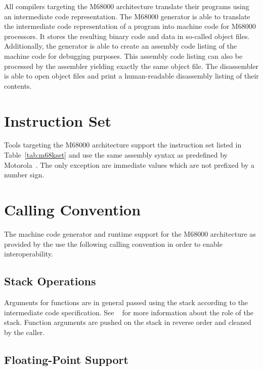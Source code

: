 All compilers targeting the M68000 architecture translate their programs using an intermediate code representation.
The M68000 generator is able to translate the intermediate code representation of a program into machine code for M68000 processors.
It stores the resulting binary code and data in so-called object files.
Additionally, the generator is able to create an assembly code listing of the machine code for debugging purposes.
This assembly code listing can also be processed by the assembler yielding exactly the same object file.
The disassembler is able to open object files and print a human-readable disassembly listing of their contents.
\seeobject\seecode

\section{Instruction Set}

Tools targeting the M68000 architecture support the instruction set listed in Table~\ref{tab:m68kset} and use the same assembly syntax as predefined by Motorola~\cite{m68k:instructionset}.
The only exception are immediate values which are not prefixed by a number sign.
\seeassembly


\section{Calling Convention}

The machine code generator and runtime support for the M68000 architecture as provided by the \ecs{} use the following calling convention in order to enable interoperability.

\subsection{Stack Operations}

Arguments for functions are in general passed using the stack according to the intermediate code specification.
See \Documentation{}~ for more information about the role of the stack.
Function arguments are pushed on the stack in reverse order and cleaned by the caller.

\subsection{Floating-Point Support}

